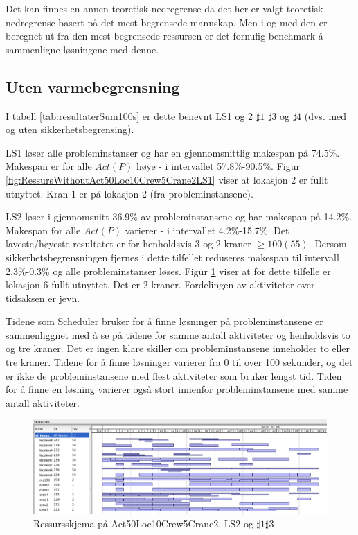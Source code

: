 Det kan finnes en annen teoretisk nedregrense da det her er valgt teoretisk nedregrense basert på det mest begrensede mannskap. Men i og med den er beregnet ut fra den mest begrensede ressursen er det fornufig benchmark å sammenligne løsningene med denne.

\subsection{Uten varmebegrensning}
I tabell \ref{tab:resultaterSum100s} er dette benevnt LS1 og 2 $\sharp 1$ $\sharp 3$ og $\sharp 4$ (dvs. med og uten sikkerhetsbegrensing).

LS1 løser alle probleminstanser og har en gjennomsnittlig makespan på 74.5\%. Makespan er for alle $Act(P)$ høye - i intervallet 57.8\%-90.5\%. Figur \ref{fig:RessursWithoutAct50Loc10Crew5Crane2LS1} viser at lokasjon 2 er fullt utnyttet. Kran 1 er på lokasjon 2 (fra probleminstansene).

LS2 løser i gjennomsnitt 36.9\% av probleminstansene og har makespan på 14.2\%. Makespan for alle $Act(P)$ varierer - i intervallet 4.2\%-15.7\%. Det laveste/høyeste resultatet er for henholdsvis 3 og 2 kraner $\ge 100(55)$. Dersom sikkerhetsbegrensningen fjernes i dette tilfellet reduseres makespan til intervall 2.3\%-0.3\% og alle probleminstanser løses. Figur \ref{fig:ResourceAct50Crane2LS2_UtenVarme_100s} viser at for dette tilfelle er lokasjon 6 fullt utnyttet. Det er 2 kraner. Fordelingen av aktiviteter over tidsaksen er jevn.

Tidene som Scheduler bruker for å finne løsninger på probleminstansene er sammenliggnet med å se på tidene for samme antall aktiviteter og henholdsvis to og tre kraner. Det er ingen klare skiller om probleminstansene inneholder to eller tre kraner. Tidene for å finne løsninger varierer fra 0 til over 100 sekunder, og det er ikke de probleminstansene med flest aktiviteter som bruker lengst tid. Tiden for å finne en løsning varierer også stort innenfor probleminstansene med samme antall aktiviteter.
\begin{figure}[!h]
\centering
\includegraphics[scale=0.4]{content/gfx/ResourceAct50Crane2LS2_UtenVarme_100s}
\caption{Ressursskjema på Act50Loc10Crew5Crane2, LS2 og $\sharp1\sharp3$}
\label{fig:ResourceAct50Crane2LS2_UtenVarme_100s}
\end{figure}

